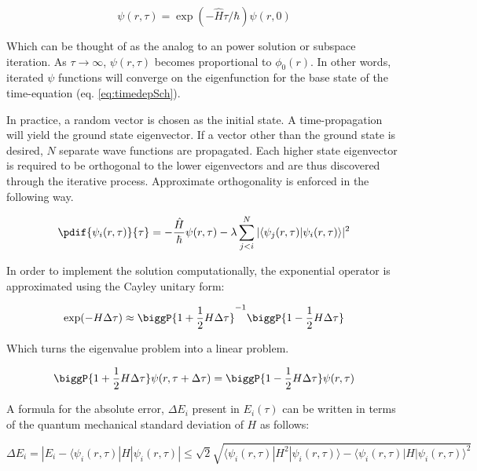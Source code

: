 \begin{equation}
\psi(r,\tau)=\exp(-\hat{H}\tau/\hbar)\psi(r,0)
\end{equation}

Which can be thought of as the analog to an power solution or subspace
iteration. As \(\tau\to\infty\), \(\psi(r,\tau)\) becomes proportional
to \(\phi_0(r)\). In other words, iterated \(\psi\) functions will
converge on the eigenfunction for the base state of the time-equation
(eq. \ref{eq:timedepSch}).

In practice, a random vector is chosen as the initial state. A
time-propagation will yield the ground state eigenvector. If a vector
other than the ground state is desired, \(N\) separate wave functions
are propagated. Each higher state eigenvector is required to be
orthogonal to the lower eigenvectors and are thus discovered through the
iterative process. Approximate orthogonality is enforced in the
following way.

\begin{equation}
\label{eq:appxOrth}
\pdif{\psi_i(r,\tau)}{\tau} = -\frac{\hat{H}}{\hbar}\psi(r,\tau)-\lambda\sum_{j < i}^N |\langle \psi_j(r,\tau)|\psi_i(r,\tau)\rangle|^2
\end{equation}

In order to implement the solution computationally, the exponential
operator is approximated using the Cayley unitary form:

\begin{equation}
\label{eq:CayleyExpansion}
\exp(-H\Delta\tau)\approx\biggP{1+\frac{1}{2}H\Delta\tau}^{-1}\biggP{1-\frac{1}{2}H\Delta\tau}
\end{equation}

Which turns the eigenvalue problem into a linear problem.

\begin{equation}
\label{eq:LinearCayleyExpansion}
\biggP{1+\frac{1}{2}H\Delta\tau}\psi(r,\tau+\Delta\tau)=\biggP{1-\frac{1}{2}H\Delta\tau}\psi(r,\tau)
\end{equation}

\begin{description}
\itemsep1pt\parskip0pt
\item[Stopping Criteria]
A formula for the absolute error, \(\Delta E_i\) present in
\(E_i(\tau)\) can be written in terms of the quantum mechanical standard
deviation of \(H\) as follows:
\end{description}

\begin{equation}
\label{eq:error}
\Delta E_i = |E_i -\langle\psi_i(r,\tau)|H|\psi_i(r,\tau)|\leq\sqrt{2}\sqrt{\langle\psi_i(r,\tau)|H^2|\psi_i(r,\tau)\rangle-\langle\psi_i(r,\tau)|H|\psi_i(r,\tau)\rangle^2}
\end{equation}

